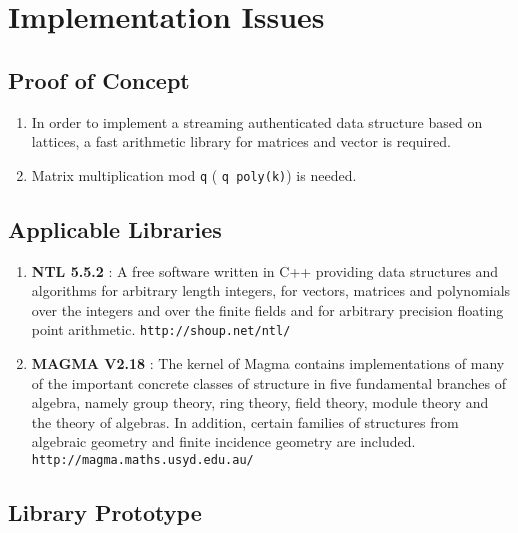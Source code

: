 \documentclass[11pt, letterpaper, oneside]{article}
\begin{document}


\section{Implementation Issues\\}
\subsection{Proof of Concept}
	\begin{enumerate}
	\item In order to implement a streaming authenticated data structure based on lattices, a fast
	arithmetic library for matrices and vector is required.
	\item Matrix multiplication mod \texttt{q} ( \texttt{q poly(k)}) is needed.
	\end{enumerate}

\subsection{Applicable Libraries\\}
	\begin{enumerate}
	\item \textbf{NTL 5.5.2} : A free software written in C++ providing data structures and algorithms for arbitrary length
	integers, for vectors, matrices and polynomials over the integers and over the finite fields and for 
	arbitrary precision floating point arithmetic. \texttt{http://shoup.net/ntl/}
	\item \textbf{MAGMA V2.18} : The kernel of Magma contains implementations of many of
the important concrete classes of 
	structure in five fundamental branches of algebra, namely group theory, ring theory, field theory, 
	module theory and the theory of algebras. In addition, certain
families of structures from algebraic 
	geometry and finite incidence geometry are included. \texttt{http://magma.maths.usyd.edu.au/}
	\end{enumerate}

\subsection{ Library Prototype\\}
\end{document}
